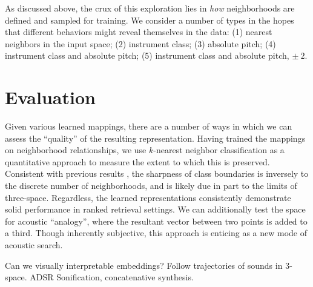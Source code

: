 \documentclass{article}
\begin{document}
As discussed above, the crux of this exploration lies in \emph{how} neighborhoods are defined and sampled for training.
We consider a number of types in the hopes that different behaviors might reveal themselves in the data:
(1) nearest neighbors in the input space;
(2) instrument class;
(3) absolute pitch;
(4) instrument class and absolute pitch;
(5) instrument class and absolute pitch, $\pm~2$.


\section{Evaluation}

Given various learned mappings, there are a number of ways in which we can assess the ``quality'' of the resulting representation.
Having trained the mappings on neighborhood relationships, we use $k$-nearest neighbor classification as a quantitative approach to measure the extent to which this is preserved.
Consistent with previous results \cite{humphrey2011nlse, humphrey2015dl4mir}, the sharpness of class boundaries is inversely to the discrete number of neighborhoods, and is likely due in part to the limits of three-space.
Regardless, the learned representations consistently demonstrate solid performance in ranked retrieval settings.
We can additionally test the space for acoustic ``analogy'', where the resultant vector between two points is added to a third.
Though inherently subjective, this approach is enticing as a new mode of acoustic search.

Can we visually interpretable embeddings?
Follow trajectories of sounds in 3-space.
ADSR
Sonification, concatenative synthesis.



\end{document}
